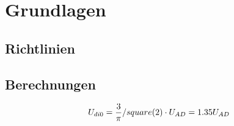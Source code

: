 \section{Grundlagen}\label{sec:Grundlagen}


\subsection{Richtlinien}\label{subsec:Richtlinien}



\subsection{Berechnungen}\label{subsec:Berechnungen}

\begin{equation}
\centering
U_{di0}=\frac{3}{\pi}/square(2)\cdot U_{AD}=1.35U_{AD}
\label{eq:B6}
\end{equation}